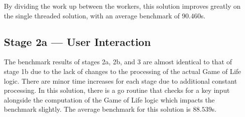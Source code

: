 \documentclass[10pt,a4paper,dvipsnames,cmyk]{scrartcl}
\begin{document}

By dividing the work up between the workers, this solution improves
greatly on the single threaded solution, with an average benchmark of
$90.460$s.

\newpage
\subsection*{Stage 2a --- User Interaction}%
\label{sub:user-interaction}


The benchmark results of stages 2a, 2b, and 3 are almost identical to that
of stage 1b due to the lack of changes to the processing of the actual
Game of Life logic. There are minor time increases for each stage due to
additional constant processing.  In this solution, there is a go routine that checks for a key input
alongside the computation of the Game of Life logic which impacts the
benchmark slightly. The average benchmark for this solution is $88.539$s.
\end{document}
